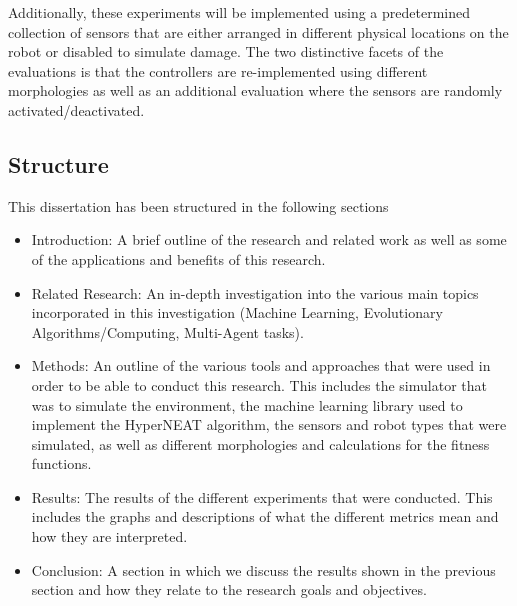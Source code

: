 Additionally, these experiments will be implemented using a predetermined collection of sensors that are either arranged in different physical locations on the robot or disabled to simulate damage.  The two distinctive facets of the evaluations is that the controllers are re-implemented using different morphologies as well as an additional evaluation where the sensors are randomly activated/deactivated.

\subsection{Structure}
This dissertation has been structured in the following sections
\begin{itemize}
	\item Introduction: A brief outline of the research and related work as well as some of the applications and benefits of this research.
	\item Related Research: An in-depth investigation into the various main topics incorporated in this investigation (Machine Learning, Evolutionary Algorithms/Computing, Multi-Agent tasks).
	\item Methods: An outline of the various tools and approaches that were used in order to be able to conduct this research. This includes the simulator that was to simulate the environment, the machine learning library used to implement the HyperNEAT algorithm, the sensors and robot types that were simulated, as well as different morphologies and calculations for the fitness functions.
	\item Results: The results of the different experiments that were conducted. This includes the graphs and descriptions of what the different metrics mean and how they are interpreted.
	\item Conclusion: A section in which we discuss the results shown in the previous section and how they relate to the research goals and objectives.
\end{itemize}



